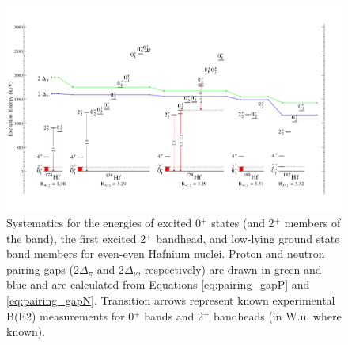 \begin{landscape}
\begin{figure}[ht] 
\begin{center}
\includegraphics[height=0.8\textheight]{figures/SciDraw_HfSystematics.pdf}
\caption{Systematics for the energies of excited 0$^+$ states (and 2$^+$ members of the band), the first excited 2$^+$ bandhead, and low-lying ground state band members for even-even Hafnium nuclei. Proton and neutron pairing gaps (2$\Delta_\pi$ and 2$\Delta_\nu$, respectively) are drawn in green and blue and are calculated from Equations \ref{eq:pairing_gapP} and \ref{eq:pairing_gapN}. Transition arrows represent known experimental B(E2) measurements for 0$^+$ bands and 2$^+$ bandheads (in W.u. where known). \label{fig:HfSystematics}}
\end{center}
\end{figure}
\end{landscape}

